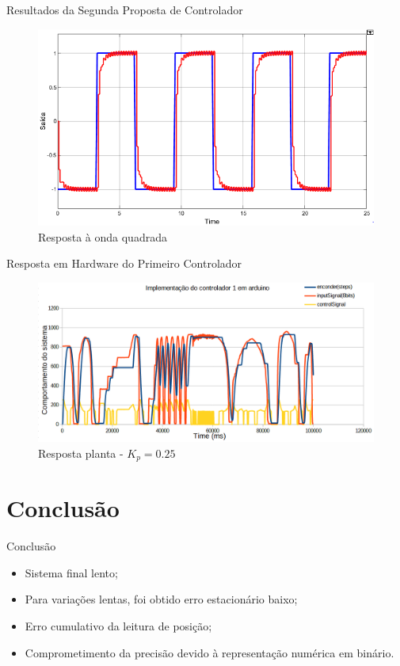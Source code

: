 \documentclass{beamer}
\begin{document}
\begin{frame}{Resultados da Segunda Proposta de Controlador}
\begin{figure}
    \centering
    \includegraphics[width = \linewidth]{src/tex/img/teste_square.PNG}
    \caption{Resposta à onda quadrada}
    \label{fig:controler2}
\end{figure}
\end{frame}

\begin{frame}{Resposta em Hardware do Primeiro Controlador}
\begin{figure}
    \centering
    \includegraphics[width = \linewidth]{src/tex/img/resultado_controle_1_implem.PNG}
    \caption{Resposta planta - $K_p = 0.25$}
    \label{fig:control_1}
\end{figure}
\end{frame}

\section{Conclusão}

\begin{frame}{Conclusão}
\begin{itemize}
    \item Sistema final lento;
    \item Para variações lentas, foi obtido erro estacionário baixo;
    \item Erro cumulativo da leitura de posição;
    \item Comprometimento da precisão devido à representação numérica em binário.
\end{itemize}
\end{frame}
\end{document}
